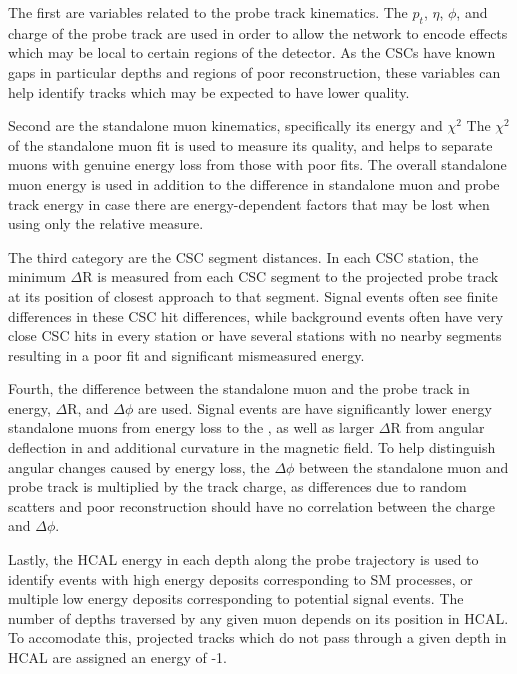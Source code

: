 The first are variables related to the probe track kinematics. 
The $p_t$, $\eta$, $\phi$, and charge of the probe track are used in order to allow the network to encode effects which may be local to certain regions of the detector.
As the CSCs have known gaps in particular depths and regions of poor reconstruction, these variables can help identify tracks which may be expected to have lower quality.

Second are the standalone muon kinematics, specifically its energy and $\chi^{2}$ %
The $\chi^{2}$ of the standalone muon fit is used to measure its quality, and helps to separate muons with genuine energy loss from those with poor fits.
The overall standalone muon energy is used in addition to the difference in standalone muon and probe track energy in case there are energy-dependent factors that may be lost when using only the relative measure.


The third category are the CSC segment distances.
In each CSC station, the minimum $\Delta$R is measured from each CSC segment to the projected probe track at its position of closest approach to that segment.
Signal events often see finite differences in these CSC hit differences, while background events often have very close CSC hits in every station or have several stations with no nearby segments resulting in a poor fit and significant mismeasured energy.

Fourth, the difference between the standalone muon and the probe track in energy, $\Delta$R, and $\Delta \phi$ are used.
Signal events are have significantly lower energy standalone muons from energy loss to the \aprime, as well as larger $\Delta$R from angular deflection in \dbrem and additional curvature in the magnetic field.
To help distinguish angular changes caused by energy loss, the $\Delta \phi$ between the standalone muon and probe track is multiplied by the track charge, as differences due to random scatters and poor reconstruction should have no correlation between the charge and $\Delta \phi$.

Lastly, the HCAL energy in each depth along the probe trajectory is used to identify events with high energy deposits corresponding to SM processes, or multiple low energy deposits corresponding to potential signal events.
The number of depths traversed by any given muon depends on its position in HCAL.
To accomodate this, projected tracks which do not pass through a given depth in HCAL are assigned an energy of -1. 

